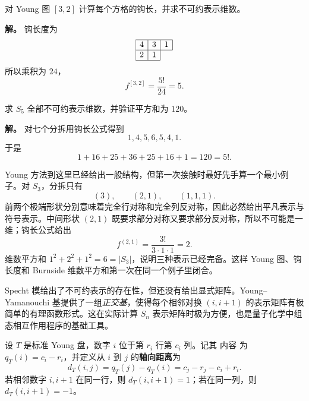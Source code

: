 \begin{workedexample}
对 Young 图 $[3,2]$ 计算每个方格的钩长，并求不可约表示维数。

\textbf{解。} 钩长度为
\[
\begin{array}{|c|c|c|}\hline
4&3&1\\\hline
2&1\\\cline{1-2}
\end{array}
\]
所以乘积为 $24$，
\[
f^{[3,2]}=\frac{5!}{24}=5.
\]
\end{workedexample}


\begin{workedexample}
求 $S_5$ 全部不可约表示维数，并验证平方和为 $120$。

\textbf{解。} 对七个分拆用钩长公式得到
\[
1,4,5,6,5,4,1.
\]
于是
\[
1+16+25+36+25+16+1=120=5!.
\]
\end{workedexample}


Young 方法到这里已经给出一般结构，但第一次接触时最好先手算一个最小例子。对 $S_3$，分拆只有
\[
(3),\qquad(2,1),\qquad(1,1,1).
\]
前两个极端形状分别意味着完全行对称和完全列反对称，因此必然给出平凡表示与符号表示。中间形状 $(2,1)$ 既要求部分对称又要求部分反对称，所以不可能是一维；钩长公式给出
\[
f^{(2,1)}=\frac{3!}{3\cdot1\cdot1}=2.
\]
维数平方和 $1^2+2^2+1^2=6=|S_3|$，说明三种表示已经完备。这样 Young 图、钩长度和 Burnside 维数平方和第一次在同一个例子里闭合。

Specht 模给出了不可约表示的存在性，但还没有给出显式矩阵。Young--Yamanouchi 基提供了一组\emph{正交基}，使得每个相邻对换 $(i,i+1)$ 的表示矩阵有极简单的有理函数形式。这在实际计算 $S_n$ 表示矩阵时极为方便，也是量子化学中组态相互作用程序的基础工具。

\begin{definition}[轴向距离]
设 $T$ 是标准 Young 盘，数字 $i$ 位于第 $r_i$ 行第 $c_i$ 列。记其 内容 为 $q_T(i)=c_i-r_i$，并定义从 $i$ 到 $j$ 的\textbf{轴向距离}为
\begin{equation}
d_T(i,j)=q_T(j)-q_T(i)=c_j-r_j-c_i+r_i.
\label{eq:axial-distance}
\end{equation}
若相邻数字 $i,i+1$ 在同一行，则 $d_T(i,i+1)=1$；若在同一列，则 $d_T(i,i+1)=-1$。
\label{def:axial-distance}
\end{definition}

